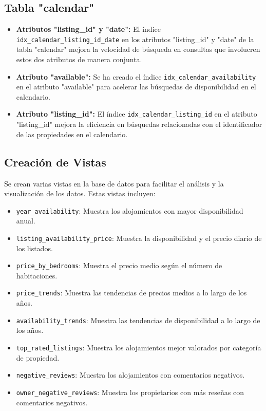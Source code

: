 \subsection*{Tabla "calendar"}

\begin{itemize}
  \item \textbf{Atributos "listing\_id" y "date":} El índice \\ \texttt{idx\_calendar\_listing\_id\_date} en los atributos "listing\_id" y "date" de la tabla "calendar" mejora la velocidad de búsqueda en consultas que involucren estos dos atributos de manera conjunta.
  \item \textbf{Atributo "available":} Se ha creado el índice \texttt{idx\_calendar\_availability} en el atributo "available" para acelerar las búsquedas de disponibilidad en el calendario.
  \item \textbf{Atributo "listing\_id":} El índice \texttt{idx\_calendar\_listing\_id} en el atributo "listing\_id" mejora la eficiencia en búsquedas relacionadas con el identificador de las propiedades en el calendario.
\end{itemize}

\subsection{Creación de Vistas}

Se crean varias vistas en la base de datos para facilitar el análisis y la visualización de los datos. Estas vistas incluyen:

\begin{itemize}
    \item \texttt{year\_availability}: Muestra los alojamientos con mayor disponibilidad anual.
    \item \texttt{listing\_availability\_price}: Muestra la disponibilidad y el precio diario de los listados.
    \item \texttt{price\_by\_bedrooms}: Muestra el precio medio según el número de habitaciones.
    \item \texttt{price\_trends}: Muestra las tendencias de precios medios a lo largo de los años.
    \item \texttt{availability\_trends}: Muestra las tendencias de disponibilidad a lo largo de los años.
    \item \texttt{top\_rated\_listings}: Muestra los alojamientos mejor valorados por categoría de propiedad.
    \item \texttt{negative\_reviews}: Muestra los alojamientos con comentarios negativos.
    \item \texttt{owner\_negative\_reviews}: Muestra los propietarios con más reseñas con comentarios negativos.
\end{itemize}
\newpage
